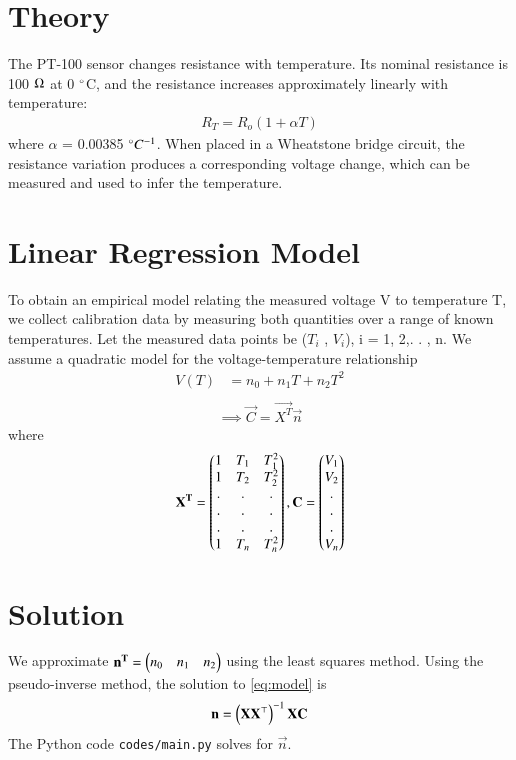 \documentclass[journal,12pt,twocolumn]{IEEEtran}
\begin{document}
\vspace{2cm}

\section{Theory}
The PT-100 sensor changes resistance with temperature. Its nominal resistance is 100 $\ohm$
at 0 $\degree$C, and the resistance increases approximately linearly with temperature:
\begin{align}
R_T = R_o(1 + \alpha T)
\end{align}
where $\alpha$ = 0.00385 $\degree C^{-1}$. When placed in a Wheatstone bridge circuit, the resistance variation produces a corresponding voltage change, which can be measured and used to infer the temperature.


\section{Linear Regression Model}
To obtain an empirical model relating the measured voltage V to temperature T, we
collect calibration data by measuring both quantities over a range of known temperatures.
Let the measured data points be ($T_i$
, $V_i$), i = 1, 2,. . , n. We assume a quadratic model for the voltage-temperature relationship
\begin{align}
    V(T) &= n_0+n_1T+n_2T^2 \\
\end{align}
\begin{align}
    \implies \vec{C} = \vec{X^T}\vec{n}  \label{eq:model}
\end{align}
where
\begin{align}
   \boldsymbol{\mathbf{X^T}} = \begin{pmatrix}1 & T_1 & T_1^2 \\ 1 & T_2 & T_2^2 \\ . & . & .\\ . & . & .\\ . & . & . \\ 1 & T_n & T_n^2\end{pmatrix}, \boldsymbol{\mathbf{C}} = \begin{pmatrix}V_1 \\ V_2 \\ . \\ . \\ . \\ V_n\end{pmatrix}
    \label{eq:x-y-theta-def}
\end{align}



\section{Solution}
We approximate $\boldsymbol{\mathbf{n^T}} = \begin{pmatrix}n_0 & n_1 & n_2\end{pmatrix}$ using the least squares method. 
Using the pseudo-inverse method, the solution to \eqref{eq:model} 
is
\begin{align}
    \boldsymbol{\mathbf{n}} = \left(\boldsymbol{\mathbf{XX}}^\top\right)^{-1}\boldsymbol{\mathbf{X}}\boldsymbol{\mathbf{C}}
\end{align}
The Python code \texttt{codes/main.py} solves for $\vec{n}$.
\end{document}
